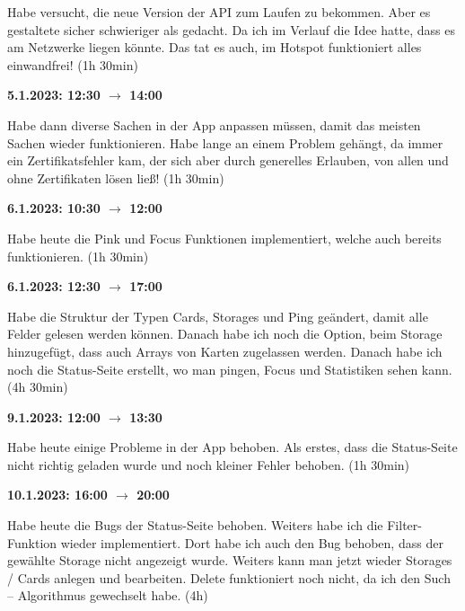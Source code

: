Habe versucht, die neue Version der API zum Laufen zu bekommen. Aber es gestaltete sicher schwieriger als gedacht. Da ich im Verlauf die Idee hatte, dass es am Netzwerke liegen könnte. Das tat es auch, im Hotspot funktioniert alles einwandfrei! (1h 30min)

\vspace{0.5cm}

\textbf{5.1.2023: 12:30 $\rightarrow$ 14:00}

Habe dann diverse Sachen in der App anpassen müssen, damit das meisten Sachen wieder funktionieren. Habe lange an einem Problem gehängt, da immer ein Zertifikatsfehler kam, der sich aber durch generelles Erlauben, von allen und ohne Zertifikaten lösen ließ! (1h 30min)

\vspace{0.5cm}

\textbf{6.1.2023: 10:30 $\rightarrow$ 12:00}

Habe heute die Pink und Focus Funktionen implementiert, welche auch bereits funktionieren. (1h 30min)

\vspace{0.5cm}

\textbf{6.1.2023: 12:30 $\rightarrow$ 17:00} \

Habe die Struktur der Typen Cards, Storages und Ping geändert, damit alle Felder gelesen werden können. Danach habe ich noch die Option, beim Storage hinzugefügt, dass auch Arrays von Karten zugelassen werden. Danach habe ich noch die Status-Seite erstellt, wo man pingen, Focus und Statistiken sehen kann. (4h 30min)

\vspace{0.5cm}

\textbf{9.1.2023: 12:00 $\rightarrow$ 13:30} \

Habe heute einige Probleme in der App behoben. Als erstes, dass die Status-Seite nicht richtig geladen wurde und noch kleiner Fehler behoben. (1h 30min)

\vspace{0.5cm}

\textbf{10.1.2023: 16:00 $\rightarrow$ 20:00} \

Habe heute die Bugs der Status-Seite behoben. Weiters habe ich die Filter-Funktion wieder implementiert. Dort habe ich auch den Bug behoben, dass der gewählte Storage nicht angezeigt wurde. Weiters kann man jetzt wieder Storages / Cards anlegen und bearbeiten. Delete funktioniert noch nicht, da ich den Such – Algorithmus gewechselt habe. (4h)

